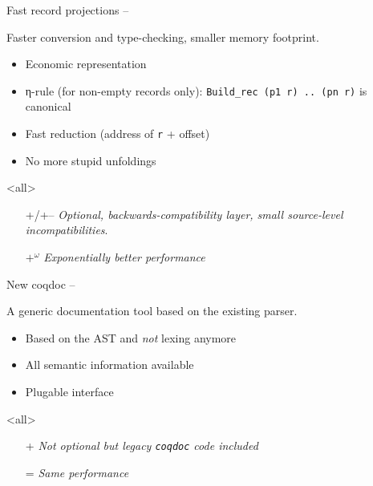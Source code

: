 \begin{subsecframefragile}{Fast record projections -- }

  \begin{center}
    Faster conversion and type-checking, smaller memory
    footprint.
  \end{center}
  
  \begin{itemize}
  \item Economic representation
  \item η-rule (for non-empty records only): 
    \verb|Build_rec (p1 r) .. (pn r)| is canonical
  \item Fast reduction (address of \verb|r| + offset)
  \item<article> No more stupid unfoldings
  \end{itemize}
  \mode<all>
    
  \begin{itemize}
  \item[+/+--] \emph{Optional, backwards-compatibility layer,
      small source-level incompatibilities}.
  \item[${+}^{ω}$] \emph{Exponentially better performance}
  \end{itemize}

\end{subsecframefragile}

\begin{subsecframe}{New coqdoc -- }

  \begin{center}
    A generic documentation tool based on the existing \Coq parser.
  \end{center}
  \begin{itemize}
  \item Based on the AST and \alert{\emph{not}} lexing anymore
  \item All semantic information available
  \item Plugable interface
  \end{itemize}
  \mode<all>

  \begin{itemize}
  \item[+] \emph{Not optional but legacy \texttt{coqdoc} code included}
  \item[=] \emph{Same performance}
  \end{itemize}
  
\end{subsecframe}

